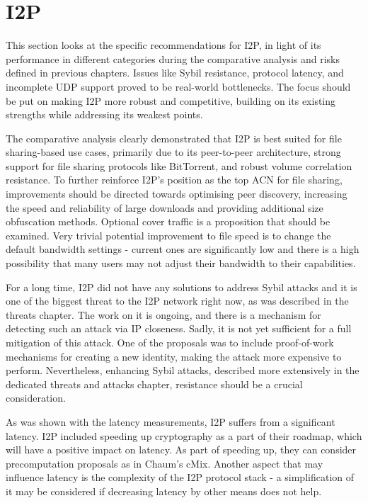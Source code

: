 \section{I2P}

This section looks at the specific recommendations for I2P, in light of its performance in different categories during the comparative analysis and risks defined in previous chapters. Issues like Sybil resistance, protocol latency, and incomplete UDP support proved to be real-world bottlenecks. The focus should be put on making I2P more robust and competitive, building on its existing strengths while addressing its weakest points.

The comparative analysis clearly demonstrated that I2P is best suited for file sharing-based use cases, primarily due to its peer-to-peer architecture, strong support for file sharing protocols like BitTorrent, and robust volume correlation resistance. To further reinforce I2P’s position as the top ACN for file sharing, improvements should be directed towards optimising peer discovery, increasing the speed and reliability of large downloads and providing additional size obfuscation methods. Optional cover traffic is a proposition that should be examined. Very trivial potential improvement to file speed is to change the default bandwidth settings - current ones are significantly low and there is a high possibility that many users may not adjust their bandwidth to their capabilities.

For a long time, I2P did not have any solutions to address Sybil attacks and it is one of the biggest threat to the I2P network right now, as was described in the threats chapter. The work on it is ongoing, and there is a mechanism for detecting such an attack via IP closeness. Sadly, it is not yet sufficient for a full mitigation of this attack. One of the proposals was to include proof-of-work mechanisms for creating a new identity, making the attack more expensive to perform. Nevertheless, enhancing Sybil attacks, described more extensively in the dedicated threats and attacks chapter, resistance should be a crucial consideration.

As was shown with the latency measurements, I2P suffers from a significant latency. I2P included speeding up cryptography as a part of their roadmap, which will have a positive impact on latency. As part of speeding up, they can consider precomputation proposals as in Chaum’s cMix. Another aspect that may influence latency is the complexity of the I2P protocol stack - a simplification of it may be considered if decreasing latency by other means does not help.

